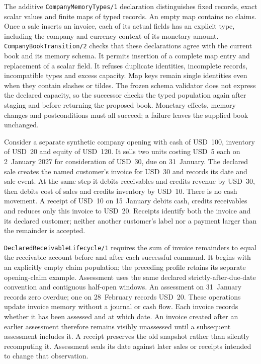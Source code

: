 The additive \texttt{CompanyMemoryTypes/1} declaration distinguishes fixed
records, exact scalar values and finite maps of typed records. An empty map
contains no claims. Once a sale inserts an invoice, each of its actual fields
has an explicit type, including the company and currency context of its
monetary amount. \texttt{CompanyBookTransition/2} checks that these declarations
agree with the current book and its memory schema. It permits insertion of a
complete map entry and replacement of a scalar field. It refuses duplicate
identities, incomplete records, incompatible types and excess capacity. Map
keys remain single identities even when they contain slashes or tildes.
The frozen schema validator does not express the declared capacity, so the
successor checks the typed population again after staging and before returning
the proposed book. Monetary effects, memory changes and postconditions must
all succeed; a failure leaves the supplied book unchanged.

Consider a separate synthetic company opening with cash of USD~100, inventory
of USD~20 and equity of USD~120. It sells two units costing USD~5 each on
2~January 2027 for consideration of USD~30, due on 31~January. The declared sale
creates the named customer's invoice for USD~30 and records its date and sale
event. At the same step it debits receivables and credits revenue by USD~30,
then debits cost of sales and credits inventory by USD~10. There is no cash
movement. A receipt of USD~10 on 15~January debits cash, credits receivables
and reduces only this invoice to USD~20. Receipts identify both the invoice
and its declared customer; neither another customer's label nor a payment
larger than the remainder is accepted.

\texttt{DeclaredReceivableLifecycle/1} requires the sum of invoice remainders
to equal the receivable account before and after each successful command.
It begins with an explicitly empty claim population; the preceding profile
retains its separate opening-claim example. Assessment uses the same declared
strictly-after-due-date convention and contiguous half-open windows. An
assessment on 31~January records zero overdue; one on 28~February records
USD~20. These operations update invoice memory without a journal or cash
flow. Each invoice records whether it has been assessed and at which date.
An invoice created after an earlier assessment therefore remains visibly
unassessed until a subsequent assessment includes it. A receipt preserves
the old snapshot rather than silently recomputing it. Assessment seals its
date against later sales or receipts intended to change that observation.

